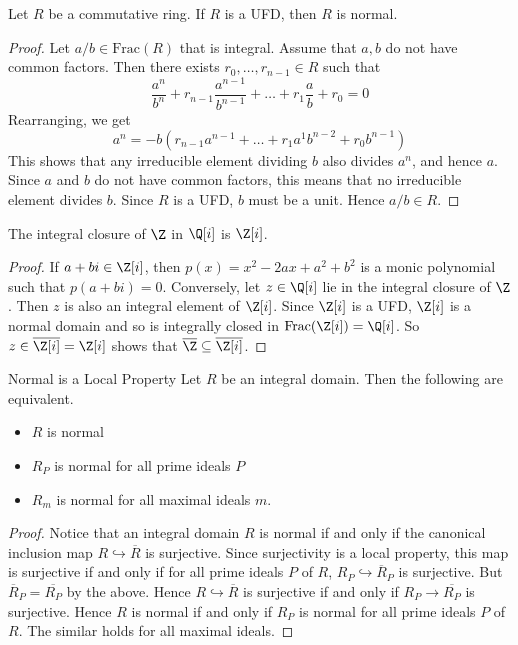 \documentclass[a4paper]{article}
\begin{document}
\begin{prp}{}{} Let $R$ be a commutative ring. If $R$ is a UFD, then $R$ is normal. 
\begin{proof}
Let $a/b\in\text{Frac}(R)$ that is integral. Assume that $a,b$ do not have common factors. Then there exists $r_0,\dots,r_{n-1}\in R$ such that $$\frac{a^n}{b^n}+r_{n-1}\frac{a^{n-1}}{b^{n-1}}+\dots+r_1\frac{a}{b}+r_0=0$$ Rearranging, we get $$a^n=-b\left(r_{n-1}a^{n-1}+\dots+r_1a^1b^{n-2}+r_0b^{n-1}\right)$$ This shows that any irreducible element dividing $b$ also divides $a^n$, and hence $a$. Since $a$ and $b$ do not have common factors, this means that no irreducible element divides $b$. Since $R$ is a UFD, $b$ must be a unit. Hence $a/b\in R$. 
\end{proof}
\end{prp}

\begin{eg}{}{} The integral closure of $\Z$ in $\Q[i]$ is $\Z[i]$. 
\begin{proof}
If $a+bi\in\Z[i]$, then $p(x)=x^2-2ax+a^2+b^2$ is a monic polynomial such that $p(a+bi)=0$. Conversely, let $z\in\Q[i]$ lie in the integral closure of $\Z$. Then $z$ is also an integral element of $\Z[i]$. Since $\Z[i]$ is a UFD, $\Z[i]$ is a normal domain and so is integrally closed in $\text{Frac}(\Z[i])=\Q[i]$. So $z\in\overline{\Z[i]}=\Z[i]$ shows that $\overline{\Z}\subseteq\overline{\Z[i]}$. 
\end{proof}
\end{eg}

\begin{prp}{Normal is a Local Property}{} Let $R$ be an integral domain. Then the following are equivalent. 
\begin{itemize}
\item $R$ is normal
\item $R_P$ is normal for all prime ideals $P$
\item $R_m$ is normal for all maximal ideals $m$. 
\end{itemize} 
\begin{proof}
Notice that an integral domain $R$ is normal if and only if the canonical inclusion map $R\hookrightarrow\overline{R}$ is surjective. Since surjectivity is a local property, this map is surjective if and only if for all prime ideals $P$ of $R$, $R_P\hookrightarrow\overline{R}_P$ is surjective. But $\overline{R}_P=\overline{R_P}$ by the above. Hence $R\hookrightarrow\overline{R}$ is surjective if and only if $R_P\to\overline{R_P}$ is surjective. Hence $R$ is normal if and only if $R_P$ is normal for all prime ideals $P$ of $R$. The similar holds for all maximal ideals. 
\end{proof}
\end{prp}
\end{document}
